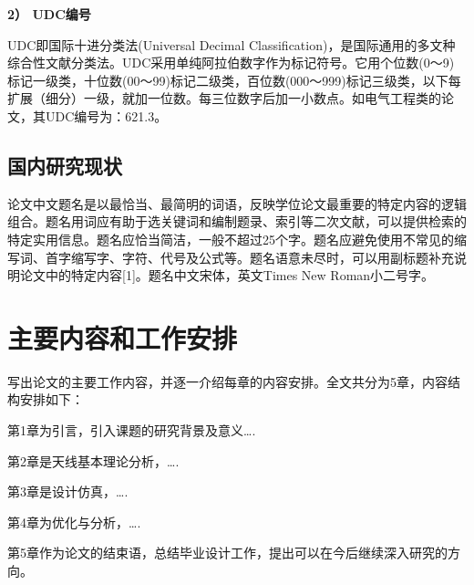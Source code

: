 \textbf{2） UDC编号	}

UDC即国际十进分类法(Universal Decimal Classification)，是国际通用的多文种综合性文献分类法。UDC采用单纯阿拉伯数字作为标记符号。它用个位数(0～9)标记一级类，十位数(00～99)标记二级类，百位数(000～999)标记三级类，以下每扩展（细分）一级，就加一位数。每三位数字后加一小数点。如电气工程类的论文，其UDC编号为：621.3。


\subsection{国内研究现状}
论文中文题名是以最恰当、最简明的词语，反映学位论文最重要的特定内容的逻辑组合。题名用词应有助于选关键词和编制题录、索引等二次文献，可以提供检索的特定实用信息。题名应恰当简洁，一般不超过25个字。题名应避免使用不常见的缩写词、首字缩写字、字符、代号及公式等。题名语意未尽时，可以用副标题补充说明论文中的特定内容[1]。题名中文宋体，英文Times New Roman小二号字。


\section{主要内容和工作安排}
写出论文的主要工作内容，并逐一介绍每章的内容安排。全文共分为5章，内容结构安排如下：

第1章为引言，引入课题的研究背景及意义….

第2章是天线基本理论分析，….

第3章是设计仿真，….

第4章为优化与分析，….

第5章作为论文的结束语，总结毕业设计工作，提出可以在今后继续深入研究的方向。


